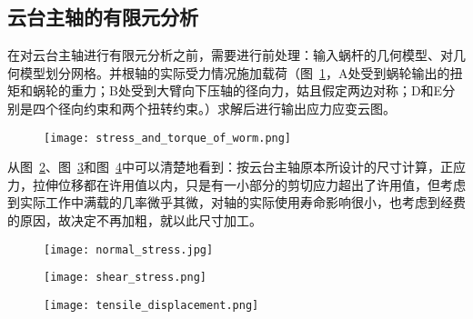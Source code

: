 
\subsection{云台主轴的有限元分析}

在对云台主轴进行有限元分析之前，需要进行前处理：输入蜗杆的几何模型、对几何模型划分网格。并根轴的实际受力情况施加载荷（图~\ref{fig:shaft_load}，A处受到蜗轮输出的扭矩和蜗轮的重力；B处受到大臂向下压轴的径向力，姑且假定两边对称；D和E分别是四个径向约束和两个扭转约束。）求解后进行输出应力应变云图。

  \begin{figure}[!h]
    \centering
    \texttt{[image: stress\_and\_torque\_of\_worm.png]}
    \label{fig:shaft_load}
  \end{figure}

  从图~\ref{fig:normalStress}、图~\ref{fig:shearStress}和图~\ref{fig:tensiledis}中可以清楚地看到：按云台主轴原本所设计的尺寸计算，正应力，拉伸位移都在许用值以内，只是有一小部分的剪切应力超出了许用值，但考虑到实际工作中满载的几率微乎其微，对轴的实际使用寿命影响很小，也考虑到经费的原因，故决定不再加粗，就以此尺寸加工。

  \begin{figure}[!htp]
    \centering
    \texttt{[image: normal\_stress.jpg]}
    \label{fig:normalStress}
  \end{figure}

  \begin{figure}[!htp]
    \centering
    \texttt{[image: shear\_stress.png]}
    \label{fig:shearStress}
  \end{figure}

  \begin{figure}[!htp]
    \centering
    \texttt{[image: tensile\_displacement.png]}
    \label{fig:tensiledis}
  \end{figure}
